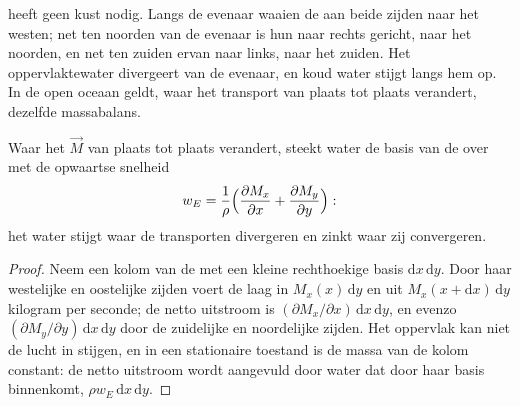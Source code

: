  heeft geen kust nodig. Langs de evenaar waaien de  aan beide zijden naar het westen; net ten noorden van de evenaar is hun  naar rechts gericht, naar het noorden, en net ten zuiden ervan naar links, naar het zuiden. Het oppervlaktewater divergeert van de evenaar, en koud water stijgt langs hem op. In de open oceaan geldt, waar het transport van plaats tot plaats verandert, dezelfde massabalans.

\begin{proposition}[Ekmanpompen]\label{prop:b1:ocean-circulation:pumping}
Waar het  $\vec M$ van plaats tot plaats verandert, steekt water de basis van de  over met de opwaartse snelheid
\[
  w_E = \frac{1}{\rho}\Bigl(\frac{\partial M_x}{\partial x} + \frac{\partial M_y}{\partial y}\Bigr):
\]
het water stijgt waar de transporten divergeren en zinkt waar zij convergeren.
\end{proposition}

\begin{proof}
Neem een kolom van de  met een kleine rechthoekige basis $\mathrm dx\,\mathrm
dy$. Door haar westelijke en oostelijke zijden voert de laag in $M_x(x)\,\mathrm dy$
en uit $M_x(x + \mathrm dx)\,\mathrm dy$ kilogram per seconde; de netto uitstroom is
$(\partial M_x/\partial x)\,\mathrm dx\,\mathrm dy$, en evenzo
$(\partial M_y/\partial y)\,\mathrm dx\,\mathrm dy$ door de zuidelijke en noordelijke
zijden. Het oppervlak kan niet de lucht in stijgen, en in een stationaire toestand is de massa
van de kolom constant: de netto uitstroom wordt aangevuld door water dat door haar
basis binnenkomt, $\rho w_E\,\mathrm dx\,\mathrm dy$.
\end{proof}

